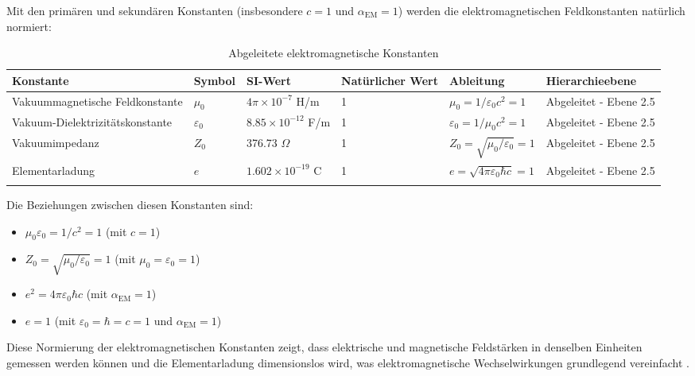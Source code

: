 \documentclass[12pt,a4paper]{article}
\newcommand{\alphaEM}{\alpha_{\text{EM}}}
\begin{document}
	Mit den primären und sekundären Konstanten (insbesondere $c = 1$ und $\alphaEM = 1$) werden die elektromagnetischen Feldkonstanten natürlich normiert:
	
	\begin{table}[h]
		\centering
		\begin{adjustbox}{scale=0.7}
			\begin{tabular}{llllll}
				\hline
				\textbf{Konstante} & \textbf{Symbol} & \textbf{SI-Wert} & \textbf{Natürlicher Wert} & \textbf{Ableitung} & \textbf{Hierarchieebene} \\
				\hline
				Vakuummagnetische Feldkonstante & $\mu_0$ & $4\pi \times 10^{-7}$ H/m & 1 & $\mu_0 = 1/\varepsilon_0c^2 = 1$ & Abgeleitet - Ebene 2.5 \\
				Vakuum-Dielektrizitätskonstante & $\varepsilon_0$ & $8.85 \times 10^{-12}$ F/m & 1 & $\varepsilon_0 = 1/\mu_0c^2 = 1$ & Abgeleitet - Ebene 2.5 \\
				Vakuumimpedanz & $Z_0$ & 376.73 $\Omega$ & 1 & $Z_0 = \sqrt{\mu_0/\varepsilon_0} = 1$ & Abgeleitet - Ebene 2.5 \\
				Elementarladung & $e$ & $1.602 \times 10^{-19}$ C & 1 & $e = \sqrt{4\pi\varepsilon_0\hbar c} = 1$ & Abgeleitet - Ebene 2.5 \\
				\hline
				\multicolumn{5}{c}{} \\
				\hline
			\end{tabular}
		\end{adjustbox}
		\caption{Abgeleitete elektromagnetische Konstanten}
		\label{tab:em_const}
	\end{table}
	
	Die Beziehungen zwischen diesen Konstanten sind:
	\begin{itemize}
		\item $\mu_0\varepsilon_0 = 1/c^2 = 1$ (mit $c = 1$)
		\item $Z_0 = \sqrt{\mu_0/\varepsilon_0} = 1$ (mit $\mu_0 = \varepsilon_0 = 1$)
		\item $e^2 = 4\pi\varepsilon_0\hbar c$ (mit $\alphaEM = 1$)
		\item $e = 1$ (mit $\varepsilon_0 = \hbar = c = 1$ und $\alphaEM = 1$)
	\end{itemize}
	
	Diese Normierung der elektromagnetischen Konstanten zeigt, dass elektrische und magnetische Feldstärken in denselben Einheiten gemessen werden können und die Elementarladung dimensionslos wird, was elektromagnetische Wechselwirkungen grundlegend vereinfacht \cite{pascher_alpha_2025}.
	
\end{document}
